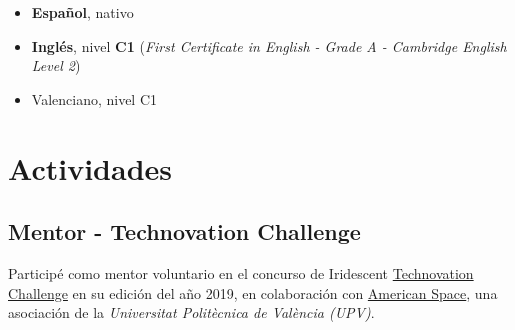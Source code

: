 \documentclass[letterpaper, 12pt, dvipsnames]{article}
\newcommand{\upvFull}{{\upvName} ({\upv})}
\newcommand{\upvName}{Universitat Politècnica de València}
\newcommand{\upv}{UPV}
\newcommand{\fce}{\emph{First Certificate in English - Grade A - Cambridge English Level 2}}
\begin{document}
\begin{itemize}
    \item \textbf{Español}, nativo
    \item \textbf{Inglés}, nivel \textbf{C1} (\fce)
    \item Valenciano, nivel C1
\end{itemize}

\section*{Actividades}

\subsection*{Mentor - Technovation Challenge}

Participé como mentor voluntario en el concurso de Iridescent \href{https://technovationchallenge.org/}{Technovation Challenge} en su edición del año 2019, en colaboración con \href{https://americanspacev.upv.es/}{American Space}, una asociación de la \emph{\upvFull}.


\end{document}
